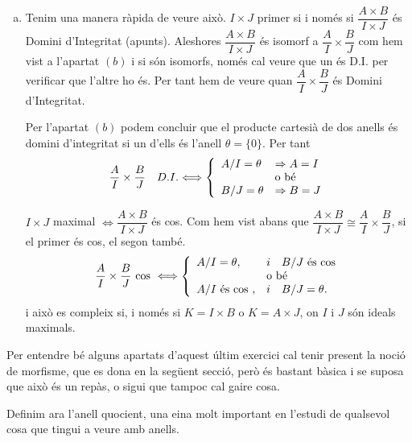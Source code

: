 \documentclass[../main.tex]{subfiles}
\begin{document}
\begin{sol}
\begin{enumerate}[(a)]
    \item Tenim una manera ràpida de veure això. $I\times J$ primer si i només si $\dfrac{A\times B}{I\times J}$ és Domini d'Integritat (apunts). Aleshores $\dfrac{A\times B}{I\times J}$ és isomorf a $\dfrac{A}{I}\times \dfrac{B}{J}$ com hem vist a l'apartat $(b)$ i si són isomorfs, només cal veure que un és D.I. per verificar que l'altre ho és. Per tant hem de veure quan $\dfrac{A}{I}\times \dfrac{B}{J}$ és Domini d'Integritat. 
    
    Per l'apartat $(b)$ podem concluir que el producte cartesià de dos anells és domini d'integritat si un d'ells és l'anell $\theta  = \{0\}$. Per tant
    \begin{equation}
        \notag
        \dfrac{A}{I}\times\dfrac{B}{J}\quad D.I. \Longleftrightarrow \left\{
        \begin{array}{ll}
             A/I = \theta & \Rightarrow A=I \\
                    & \text{o bé} \\
            B/J = \theta & \Rightarrow B=J
        \end{array}
        \right.
    \end{equation}
    
    $I\times J$ maximal $\Longleftrightarrow \dfrac{A\times B}{I\times J}$ és cos. Com hem vist abans que $\dfrac{A\times B}{I\times J} \cong \dfrac{A}{I}\times \dfrac{B}{J}$, si el primer és cos, el segon també. 
    \begin{equation}
        \notag
        \dfrac{A}{I}\times \dfrac{B}{J} \text{ cos } \Longleftrightarrow\left\{
        \begin{array}{ll}
             A/I = \theta, & i \quad B/J \text{ és cos} \\
                        &\text{o bé} \\
             A/I \text{ és cos }, & i \quad B/J=\theta.
        \end{array}
        \right.
    \end{equation}
    i això es compleix si, i només si $K=I\times B$ o $K=A\times J$, on $I$ i $J$ són ideals maximals.
\end{enumerate}
\end{sol}

Per entendre bé alguns apartats d'aquest últim exercici cal tenir present la noció de morfisme, que es dona en la següent secció, però és bastant bàsica i se suposa que això és un repàs, o sigui que tampoc cal gaire cosa.

Definim ara l'anell quocient, una eina molt important en l'estudi de qualsevol cosa que tingui a veure amb anells.
\end{document}
